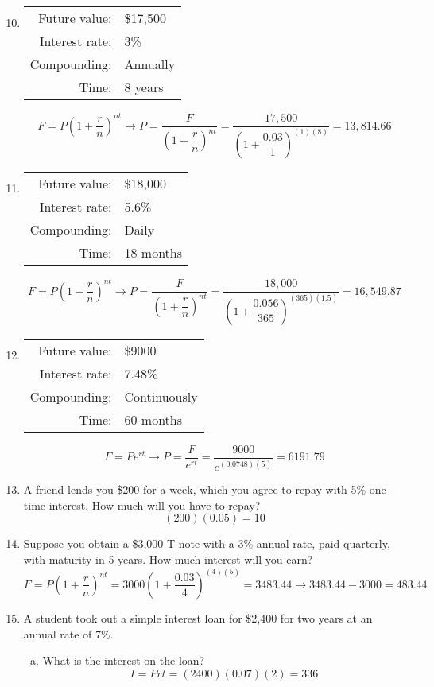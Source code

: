 \begin{enumerate}
\setcounter{enumi}{9}
\item \begin{tabular}{r l}
Future value: & \$17,500\\
Interest rate: & 3\%\\
Compounding: & Annually\\
Time: & 8 years
\end{tabular} 
\[F = P\left(1 + \dfrac{r}{n}\right)^{nt} \longrightarrow P = \dfrac{F}{\left(1 + \dfrac{r}{n}\right)^{nt}} = \dfrac{17,500}{\left(1 + \dfrac{0.03}{1}\right)^{(1)(8)}} = 13,814.66\]

\item \begin{tabular}{r l}
Future value: & \$18,000\\
Interest rate: & 5.6\%\\
Compounding: & Daily\\
Time: & 18 months
\end{tabular} 
\[F = P\left(1 + \dfrac{r}{n}\right)^{nt} \longrightarrow P = \dfrac{F}{\left(1 + \dfrac{r}{n}\right)^{nt}} = \dfrac{18,000}{\left(1 + \dfrac{0.056}{365}\right)^{(365)(1.5)}} = 16,549.87\]

\item \begin{tabular}{r l}
Future value: & \$9000\\
Interest rate: & 7.48\%\\
Compounding: & Continuously\\
Time: & 60 months
\end{tabular} 
\[F = Pe^{rt} \longrightarrow P = \dfrac{F}{e^{rt}} = \dfrac{9000}{e^{(0.0748)(5)}} = 6191.79\]

\item A friend lends you \$200 for a week, which you agree to repay with 5\% one-time interest. How much will you have to repay? 
\[(200)(0.05) = 10\]

\item Suppose you obtain a \$3,000 T-note with a 3\% annual rate, paid quarterly, with maturity in 5 years.  How much interest will you earn? 
\[F = P\left(1 + \dfrac{r}{n}\right)^{nt} = 3000\left(1 + \dfrac{0.03}{4}\right)^{(4)(5)} = 3483.44 \longrightarrow 3483.44 - 3000 = 483.44\]

\item A student took out a simple interest loan for \$2,400 for two years at an annual rate of 7\%.  
\begin{enumerate}[(a)]
\item What is the interest on the loan? 
\[I = Prt = (2400)(0.07)(2) = 336\]


\end{enumerate}
\end{enumerate}
